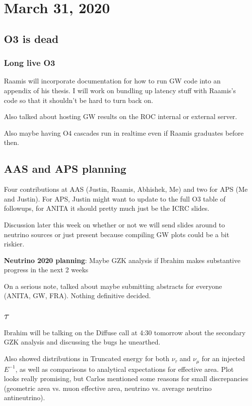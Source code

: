 

\chapter{March 31, 2020}

\section{O3 is dead}
\subsection{Long live O3}
Raamis will incorporate documentation for how to run GW code into an appendix of his thesis. I will work on bundling up latency stuff with Raamis's code so that it shouldn't be hard to turn back on. 

Also talked about hosting GW results on the ROC internal or external server. 

Also maybe having O4 cascades run in realtime even if Raamis graduates before then.

\section{AAS and APS planning}
Four contributions at AAS (Justin, Raamis, Abhishek, Me) and two for APS (Me and Justin).
For APS, Justin might want to update to the full O3 table of followups, for ANITA it should pretty much just be the ICRC slides.

Discussion later this week on whether or not we will send slides around to neutrino sources or just present because compiling GW plots could be a bit riskier.

\textbf{Neutrino 2020 planning}: Maybe GZK analysis if Ibrahim makes substantive progress in the next 2 weeks

On a serious note, talked about maybe submitting abstracts for everyone (ANITA, GW, FRA). Nothing definitive decided.

\section{$\tau$}
Ibrahim will be talking on the Diffuse call at 4:30 tomorrow about the secondary GZK analysis and discussing the bugs he unearthed. 

Also showed distributions in Truncated energy for both $\nu_{\tau}$ and $\nu_{\mu}$ for an injected $E^{-1}$, as well as comparisons to analytical expectations for effective area. Plot looks really promising, but Carlos mentioned some reasons for small discrepancies (geometric area vs. muon effective area, neutrino vs. average neutrino antineutrino).

